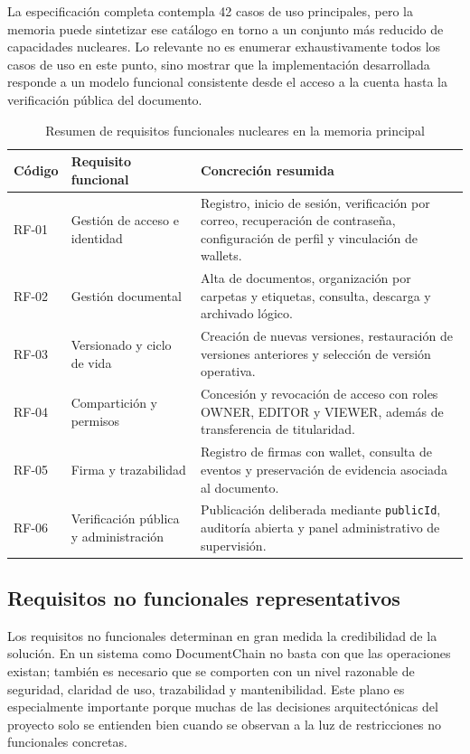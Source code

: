 \documentclass[11pt, a4paper]{article}
\begin{document}
La especificación completa contempla 42 casos de uso principales, pero la memoria puede sintetizar ese catálogo en torno a un conjunto más reducido de capacidades nucleares. Lo relevante no es enumerar exhaustivamente todos los casos de uso en este punto, sino mostrar que la implementación desarrollada responde a un modelo funcional consistente desde el acceso a la cuenta hasta la verificación pública del documento.

\begin{table}[H]
    \centering
    \small
    \begin{tabular}{|p{2.2cm}|p{3.6cm}|p{7.3cm}|}
    \hline
    \textbf{Código} & \textbf{Requisito funcional} & \textbf{Concreción resumida} \\
    \hline
    RF-01 & Gestión de acceso e identidad & Registro, inicio de sesión, verificación por correo, recuperación de contraseña, configuración de perfil y vinculación de wallets. \\
    \hline
    RF-02 & Gestión documental & Alta de documentos, organización por carpetas y etiquetas, consulta, descarga y archivado lógico. \\
    \hline
    RF-03 & Versionado y ciclo de vida & Creación de nuevas versiones, restauración de versiones anteriores y selección de versión operativa. \\
    \hline
    RF-04 & Compartición y permisos & Concesión y revocación de acceso con roles OWNER, EDITOR y VIEWER, además de transferencia de titularidad. \\
    \hline
    RF-05 & Firma y trazabilidad & Registro de firmas con wallet, consulta de eventos y preservación de evidencia asociada al documento. \\
    \hline
    RF-06 & Verificación pública y administración & Publicación deliberada mediante \texttt{publicId}, auditoría abierta y panel administrativo de supervisión. \\
    \hline
    \end{tabular}
    \caption{Resumen de requisitos funcionales nucleares en la memoria principal}
    \label{tab:rf-nucleares-memoria}
\end{table}

\subsection{Requisitos no funcionales representativos}

Los requisitos no funcionales determinan en gran medida la credibilidad de la solución. En un sistema como DocumentChain no basta con que las operaciones existan; también es necesario que se comporten con un nivel razonable de seguridad, claridad de uso, trazabilidad y mantenibilidad. Este plano es especialmente importante porque muchas de las decisiones arquitectónicas del proyecto solo se entienden bien cuando se observan a la luz de restricciones no funcionales concretas.
\end{document}
